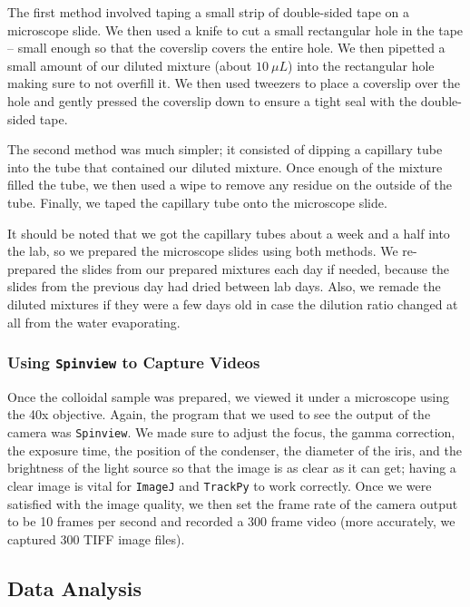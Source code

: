 \documentclass[twocolumn,amsmath,amssymb,pra, floatfix]{revtex4-2}
\begin{document}
The first method involved taping a small strip of double-sided tape on a microscope slide. We then used a knife to cut a small rectangular hole in the tape -- small enough so that the coverslip covers the entire hole. We then pipetted a small amount of our diluted mixture (about $10 \ \si{\mu L}$) into the rectangular hole making sure to not overfill it. We then used tweezers to place a coverslip over the hole and gently pressed the coverslip down to ensure a tight seal with the double-sided tape.

The second method was much simpler; it consisted of dipping a capillary tube into the tube that contained our diluted mixture. Once enough of the mixture filled the tube, we then used a wipe to remove any residue on the outside of the tube. Finally, we taped the capillary tube onto the microscope slide. 

It should be noted that we got the capillary tubes about a week and a half into the lab, so we prepared the microscope slides using both methods. We re-prepared the slides from our prepared mixtures each day if needed, because the slides from the previous day had dried between lab days. Also, we remade the diluted mixtures if they were a few days old in case the dilution ratio changed at all from the water evaporating.

\subsubsection{Using \texttt{Spinview} to Capture Videos}
Once the colloidal sample was prepared, we viewed it under a microscope using the 40x objective. Again, the program that we used to see the output of the camera was \texttt{Spinview}. We made sure to adjust the focus, the gamma correction, the exposure time, the position of the condenser, the diameter of the iris, and the brightness of the light source so that the image is as clear as it can get; having a clear image is vital for \texttt{ImageJ} and \texttt{TrackPy} to work correctly. Once we were satisfied with the image quality, we then set the frame rate of the camera output to be 10 frames per second and recorded a 300 frame video (more accurately, we captured 300 TIFF image files).

\subsection{Data Analysis}
\end{document}
